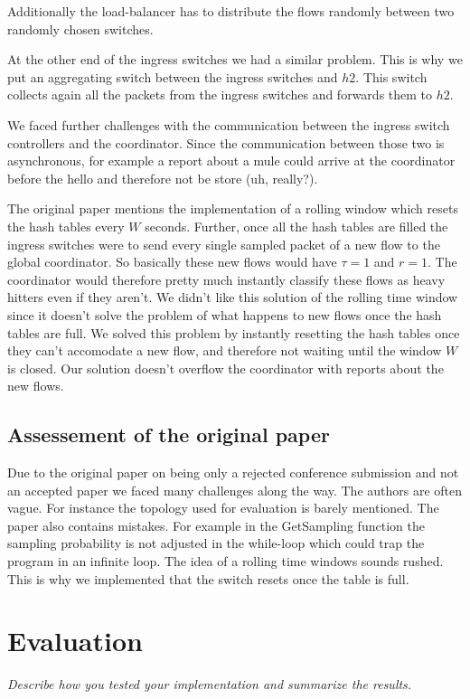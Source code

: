 \documentclass[11pt,oneside,a4paper]{article}
\newcommand{\hint}[1]{{\color{blue} \em #1}}
\begin{document}
Additionally the load-balancer has to distribute the flows randomly between two randomly chosen switches. 

At the other end of the ingress switches we had a similar problem. This is why we put an aggregating switch between the ingress switches and $h2$. This switch collects again all the packets from the ingress switches and forwards them to $h2$. 

We faced further challenges with the communication between the ingress switch controllers and the coordinator. Since the communication between those two is asynchronous, for example a report about a mule could arrive at the coordinator before the hello and therefore not be store (uh, really?). 

The original paper mentions the implementation of a rolling window which resets the hash tables every $W$ seconds. Further, once all the hash tables are filled the ingress switches were to send every single sampled packet of a new flow to the global coordinator. So basically these new flows would have $\tau = 1$ and $r = 1$. The coordinator would therefore pretty much instantly classify these flows as heavy hitters even if they aren't. We didn't like this solution of the rolling time window since it doesn't solve the problem of what happens to new flows once the hash tables are full. We solved this problem by instantly resetting the hash tables once they can't accomodate a new flow, and therefore not waiting until the window $W$ is closed. Our solution doesn't overflow the coordinator with reports about the new flows.



\subsection{Assessement of the original paper} \label{original_paper}
Due to the original paper on being only a rejected conference submission and not an accepted paper we faced many challenges along the way. The authors are often vague. For instance the topology used for evaluation is barely mentioned. The paper also contains mistakes. For example in the GetSampling function the sampling probability is not adjusted in the while-loop which could trap the program in an infinite loop. The idea of a rolling time windows sounds rushed. This is why we implemented that the switch resets once the table is full.


\section{Evaluation}
\hint{Describe how you tested your implementation and summarize the results.} \\
\end{document}
